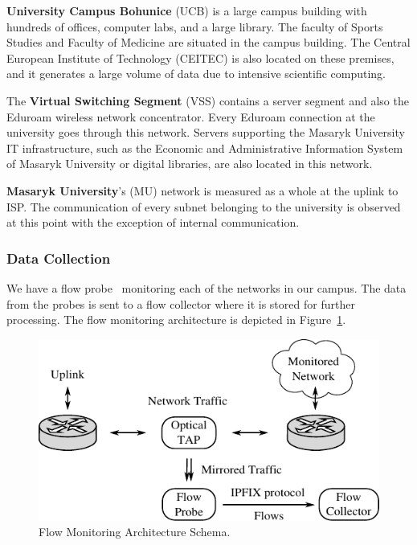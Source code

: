 \textbf{University Campus Bohunice} (UCB) is a large campus building with hundreds of offices, computer labs, and a large library. The faculty of Sports Studies and Faculty of Medicine are situated in the campus building. The Central European Institute of Technology (CEITEC) is also located on these premises, and it generates a large volume of data due to intensive scientific computing.

The \textbf{Virtual Switching Segment} (VSS) contains a server segment and also the Eduroam wireless network concentrator. Every Eduroam connection at the university goes through this network. Servers supporting the Masaryk University IT infrastructure, such as the Economic and Administrative Information System of Masaryk University or digital libraries, are also located in this network.

\textbf{Masaryk University}'s (MU) network is measured as a whole at the uplink to ISP. The communication of every subnet belonging to the university is observed at this point with the exception of internal communication.

\subsubsection{Data Collection}

We have a flow probe~\cite{Hofstede-2014-Flow} monitoring each of the networks in our campus. The data from the probes is sent to a flow collector where it is stored for further processing. The flow monitoring architecture is depicted in Figure~\ref{fig:characterization-monitoring-architecture}.

\begin{figure}[!t]
        \begin{center}
                \includegraphics{figures/paper-characterization/monitoring_architecture}
                \caption{Flow Monitoring Architecture Schema.}
                \label{fig:characterization-monitoring-architecture}
        \end{center}
\end{figure}

